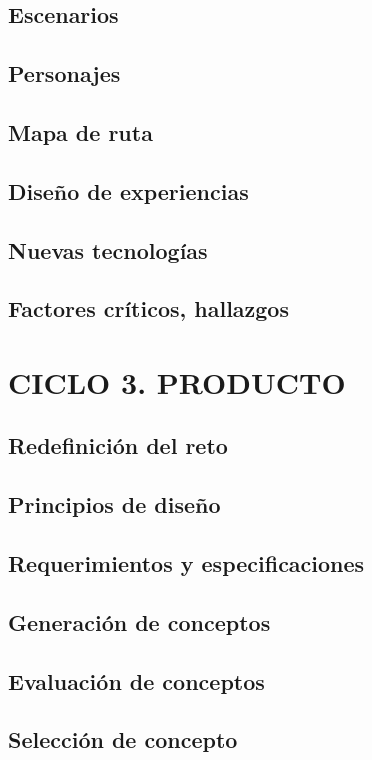 \documentclass[12pt,letterpaper]{book}
\begin{document}
\section{Escenarios}
\section{Personajes}
\section{Mapa de ruta}
\section{Diseño de experiencias}
\section{Nuevas tecnologías}
\section{Factores críticos, hallazgos}

\newpage

\chapter{CICLO 3. PRODUCTO}
\section{Redefinición del reto}
\section{Principios de diseño}
\section{Requerimientos y especificaciones}
\section{Generación de conceptos}
\section{Evaluación de conceptos}
\section{Selección de concepto}
\end{document}
